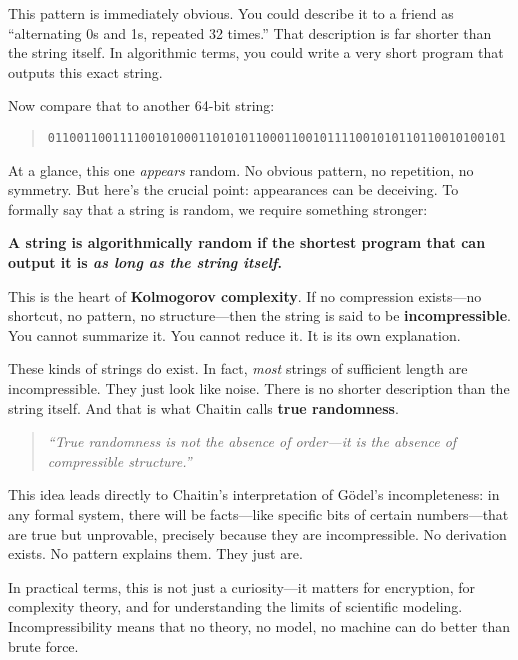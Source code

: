 This pattern is immediately obvious. You could describe it to a friend as ``alternating 0s and 1s, repeated 32 times.'' That description is far shorter than the string itself. In algorithmic terms, you could write a very short program that outputs this exact string.

Now compare that to another 64-bit string:

\begin{quote}
\texttt{0110011001111001010001101010110001100101111001010110110010100101}
\end{quote}

At a glance, this one \emph{appears} random. No obvious pattern, no repetition, no symmetry. But here’s the crucial point: appearances can be deceiving. To formally say that a string is random, we require something stronger:

\begin{center}
\textbf{A string is algorithmically random if the shortest program that can output it is \emph{as long as the string itself}.}
\end{center}

This is the heart of \textbf{Kolmogorov complexity}. If no compression exists—no shortcut, no pattern, no structure—then the string is said to be \textbf{incompressible}. You cannot summarize it. You cannot reduce it. It is its own explanation.

These kinds of strings do exist. In fact, \emph{most} strings of sufficient length are incompressible. They just look like noise. There is no shorter description than the string itself. And that is what Chaitin calls \textbf{true randomness}.

\medskip

\begin{quote}
\textit{“True randomness is not the absence of order—it is the absence of compressible structure.”}
\end{quote}

\medskip

This idea leads directly to Chaitin’s interpretation of Gödel’s incompleteness: in any formal system, there will be facts—like specific bits of certain numbers—that are true but unprovable, precisely because they are incompressible. No derivation exists. No pattern explains them. They just are.

\medskip

In practical terms, this is not just a curiosity—it matters for encryption, for complexity theory, and for understanding the limits of scientific modeling. Incompressibility means that no theory, no model, no machine can do better than brute force.

